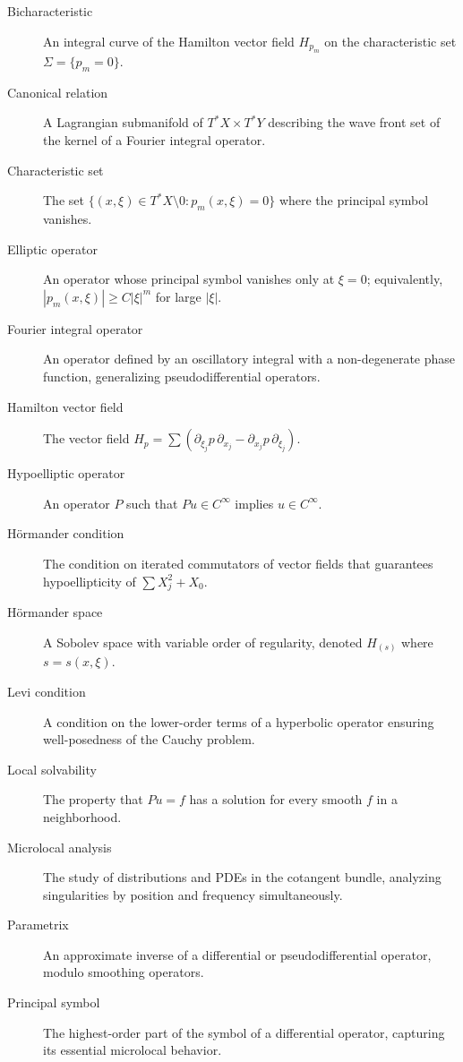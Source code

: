 \begin{description}
    \item[Bicharacteristic] An integral curve of the Hamilton vector
    field \(H_{p_m}\) on the characteristic set \(\Sigma = \{p_m = 0\}\).
    \item[Canonical relation] A Lagrangian submanifold of
    \(T^*X \times T^*Y\) describing the wave front set of the kernel of
    a Fourier integral operator.
    \item[Characteristic set] The set \(\{(x,\xi) \in T^*X \setminus 0
    : p_m(x,\xi) = 0\}\) where the principal symbol vanishes.
    \item[Elliptic operator] An operator whose principal symbol vanishes
    only at \(\xi = 0\); equivalently, \(|p_m(x,\xi)| \geq C|\xi|^m\)
    for large \(|\xi|\).
    \item[Fourier integral operator] An operator defined by an
    oscillatory integral with a non-degenerate phase function,
    generalizing pseudodifferential operators.
    \item[Hamilton vector field] The vector field
    \(H_p = \sum (\partial_{\xi_j} p \,\partial_{x_j} - \partial_{x_j} p
    \,\partial_{\xi_j})\).
    \item[Hypoelliptic operator] An operator \(P\) such that
    \(Pu \in C^\infty\) implies \(u \in C^\infty\).
    \item[H\"ormander condition] The condition on iterated commutators
    of vector fields that guarantees hypoellipticity of
    \(\sum X_j^2 + X_0\).
    \item[H\"ormander space] A Sobolev space with variable order of
    regularity, denoted \(H_{(s)}\) where \(s = s(x,\xi)\).
    \item[Levi condition] A condition on the lower-order terms of a
    hyperbolic operator ensuring well-posedness of the Cauchy problem.
    \item[Local solvability] The property that \(Pu = f\) has a
    solution for every smooth \(f\) in a neighborhood.
    \item[Microlocal analysis] The study of distributions and PDEs in
    the cotangent bundle, analyzing singularities by position and
    frequency simultaneously.
    \item[Parametrix] An approximate inverse of a differential or
    pseudodifferential operator, modulo smoothing operators.
    \item[Principal symbol] The highest-order part of the symbol of a
    differential operator, capturing its essential microlocal behavior.

\end{description}
